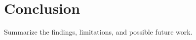 \chapter{Conclusion}
\label{ch:conclusion}

Summarize the findings, limitations, and possible future work.
